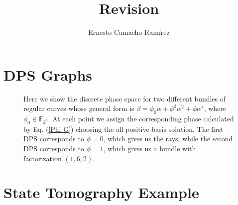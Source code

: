\documentclass[a4paper]{article}
\title{Revision}
\author{Ernesto Camacho Ramírez}
\begin{document}
  \maketitle

  \section{DPS Graphs}

  \begin{figure}[ht]%
    \centering
	\caption{
      Here we show the discrete phase space for two
      different bundles of regular curves whose general form
      is $\beta = \phi_0 \alpha + \phi^2 \alpha^2 + \phi
      \alpha^{4}$, where $\phi_0 \in \mathbb F_{2^3}$. At
      each point we assign the corresponding phase
      calculated by Eq. (\ref{Phi G}) choosing the all
      positive basis solution. The first DPS corresponds to
      $\phi = 0$, which gives us the rays; while the second
      DPS corresponds to $\phi = 1$, which gives us a bundle
      with factorization $(1,6,2)$.
	}%
    \label{fig-DPS}%
  \end{figure}

  
  \section{State Tomography Example}
\end{document}

